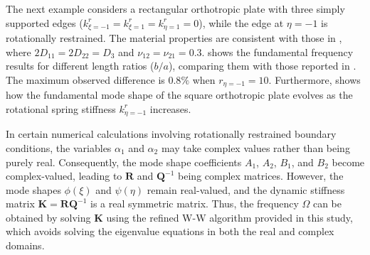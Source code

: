 \documentclass[preprint,12pt]{elsarticle}
\begin{document}
The next example considers a rectangular orthotropic plate with three simply supported edges (\(k^r_{\xi=-1} = k^r_{\xi=1} = k^r_{\eta=1} = 0\)), while the edge at \(\eta = -1\) is rotationally restrained. 
The material properties are consistent with those in \citealp{zhang2019new}, where \(2D_{11} = 2D_{22} = D_3\) and \(\nu_{12} = \nu_{21} = 0.3\).  
 shows the fundamental frequency results for different length ratios (\(b/a\)), comparing them with those reported in \citealp{zhang2019new}. 
The maximum observed difference is $0.8\%$ when \(r_{\eta=-1} = 10\). 
Furthermore,  shows how the fundamental mode shape of the square orthotropic plate evolves as the rotational spring stiffness \(k^r_{\eta=-1}\) increases.  

In certain numerical calculations involving rotationally restrained boundary conditions, the variables $\alpha_1$ and $\alpha_2$ may take complex values rather than being purely real.  
Consequently, the mode shape coefficients $A_1$, $A_2$, $B_1$, and $B_2$ become complex-valued, leading to $\mathbf{R}$ and $\mathbf{Q}^{-1}$ being complex matrices.  
However, the mode shapes $\phi(\xi)$ and $\psi(\eta)$ remain real-valued, and the dynamic stiffness matrix $\mathbf{K} = \mathbf{R}\mathbf{Q}^{-1}$ is a real symmetric matrix.
Thus, the frequency $\Omega$ can be obtained by solving $\mathbf{K}$ using the refined W-W algorithm provided in this study, which avoids solving the eigenvalue equations in both the real and complex domains.
\end{document}
